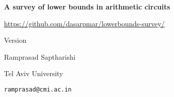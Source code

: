 \documentclass[12pt]{report}
\begin{document}
\begin{titlepage}
  \vspace*{4cm}
  \begin{center}
    {\Huge {\bf A survey of lower bounds in arithmetic circuits}}
  
    \vspace*{2cm}

    {\large \url{https://github.com/dasarpmar/lowerbounds-survey/}}
    
    {\large Version \currentversion}

    \vfill
    
    {\Large Ramprasad Saptharishi}

    {\large Tel Aviv University}

    {\large \texttt{ramprasad@cmi.ac.in}}
\end{center}
\end{titlepage}


\end{document}
